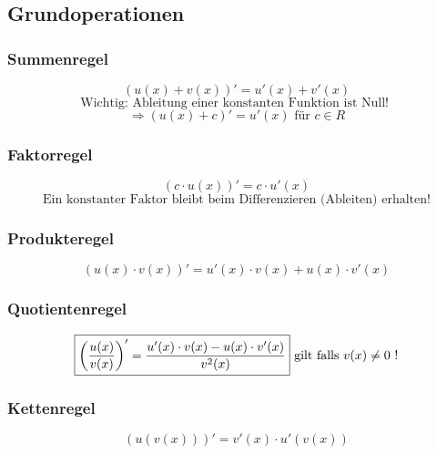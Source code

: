 \subsection{Grundoperationen}

\subsubsection{Summenregel}
\[ \boxed{ (u(x) + v(x))' = u'(x) + v'(x) } \]
\[ \text{Wichtig: Ableitung einer konstanten Funktion ist Null! } \]
\[ \Rightarrow (u(x) + c)' = u'(x) \text{ für } c \in R \]

\subsubsection{Faktorregel}
\[ \boxed{ (c \cdot u(x))' = c \cdot u'(x) } \]
\[ \text{Ein konstanter Faktor bleibt beim Differenzieren (Ableiten) erhalten!} \]

\subsubsection{Produkteregel}
\[ \boxed{ (u(x) \cdot v(x))' = u'(x) \cdot v(x) + u(x) \cdot v'(x) } \]

\subsubsection{Quotientenregel}
\[ \boxed{ \left( \frac{u(x)}{v(x)} \right)' = \frac{ u'(x) \cdot v(x) - u(x) \cdot v'(x) }{ v^2(x) } } \\ \text{ gilt falls }v(x) \neq 0 \text{ !} \]

\subsubsection{Kettenregel}
\[ \boxed{ (u(v(x)))' = v'(x) \cdot u'(v(x)) } \]


